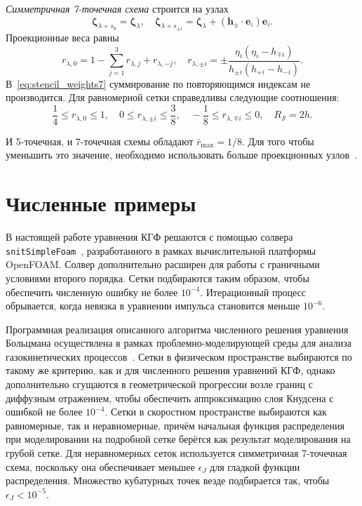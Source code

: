 \documentclass[
aps,%
12pt,%
final,%
notitlepage,%
oneside,%
onecolumn,%
nobibnotes,%
nofootinbib,%
superscriptaddress,%
noshowpacs,%
showkeys,%
floatfix,%
tightenlines,%
centertags]%
{revtex4}
\newcommand{\bzeta}{\boldsymbol{\zeta}}
\newcommand{\bh}{\boldsymbol{h}}
\newcommand{\be}{\boldsymbol{e}}
\begin{document}
\emph{Симметричная 7-точечная схема} строится на узлах
\begin{equation}\label{eq:stencil_nodes7}
    \bzeta_{\lambda+s_0} = \bzeta_{\lambda}, \quad
    \bzeta_{\lambda+s_{\pm i}} = \bzeta_{\lambda} + (\bh_\pm\cdot \be_i)\be_i.
\end{equation}
Проекционные веса равны
\begin{equation}\label{eq:stencil_weights7}
    r_{\lambda,0} = 1 - \sum_{j=1}^3 r_{\lambda,j} + r_{\lambda,-j}, \quad
    r_{\lambda,\pm i} = \pm\frac{\eta_i(\eta_i - h_{\mp i})}{h_{\pm i}(h_{+i}-h_{-i})}.
\end{equation}
В~\eqref{eq:stencil_weights7} суммирование по повторяющимся индексам не производится.
Для равномерной сетки справедливы следующие соотношения:
\begin{equation}\label{eq:weights_ranges7}
    \frac14 \leq r_{\lambda,0} \leq 1, \quad
    0 \leq r_{\lambda,\pm i} \leq \frac38, \quad
    -\frac18 \leq r_{\lambda,\mp i} \leq 0, \quad
    R_\mathcal{S} = 2h.
\end{equation}

И 5-точечная, и 7-точечная схемы обладают \(\bar{r}_{\max}=1/8\).
Для того чтобы уменьшить это значение, необходимо использовать больше проекционных узлов~\citep{Dodulad2012}.

\section{Численные примеры}

В настоящей работе уравнения КГФ решаются с помощью солвера \verb+snitSimpleFoam+~\cite{Rogozin2014},
разработанного в рамках вычислительной платформы OpenFOAM\textregistered{}.
Солвер дополнительно расширен для работы с граничными условиями второго порядка.
Сетки подбираются таким образом, чтобы обеспечить численную ошибку не более \(10^{-4}\).
Итерационный процесс обрывается, когда невязка в уравнении импульса становится меньше \(10^{-6}\).

Программная реализация описанного алгоритма численного решения уравнения Больцмана
осуществлена в рамках проблемно-моделирующей среды
для анализа газокинетических процессов~\cite{Kloss2011, Kloss2012}.
Сетки в физическом пространстве выбираются по такому же критерию, как и для численного решения уравнений КГФ,
однако дополнительно сгущаются в геометрической прогрессии возле границ с диффузным отражением,
чтобы обеспечить аппроксимацию слоя Кнудсена с ошибкой не более \(10^{-4}\).
Сетки в скоростном пространстве выбираются как равномерные, так и неравномерные,
причём начальная функция распределения при моделировании на подробной сетке берётся
как результат моделирования на грубой сетке.
Для неравномерных сеток используется симметричная 7-точечная схема, поскольку она
обеспечивает меньшее \(\epsilon_J\) для гладкой функции распределения.
Множество кубатурных точек везде подбирается так, чтобы \(\epsilon_J < 10^{-5}\).
\end{document}
